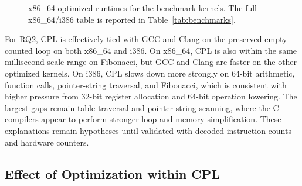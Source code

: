 \documentclass[10pt,twocolumn]{article}
\begin{document}
\begin{figure}[t]
\centering
{}
\caption{x86\_64 optimized runtimes for the benchmark kernels. The full x86\_64/i386 table is reported in Table~\ref{tab:benchmarks}.}
\label{fig:bench-optimized}
\end{figure}

\par For RQ2, CPL is effectively tied with GCC and Clang on the preserved empty counted loop on both x86\_64 and i386. On x86\_64, CPL is also within the same millisecond-scale range on Fibonacci, but GCC and Clang are faster on the other optimized kernels. On i386, CPL slows down more strongly on 64-bit arithmetic, function calls, pointer-string traversal, and Fibonacci, which is consistent with higher pressure from 32-bit register allocation and 64-bit operation lowering. The largest gaps remain table traversal and pointer string scanning, where the C compilers appear to perform stronger loop and memory simplification. These explanations remain hypotheses until validated with decoded instruction counts and hardware counters.

\subsection{Effect of Optimization within CPL}
\end{document}
